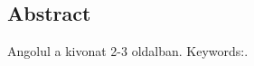 \begin{titlepage}

\section*{Abstract}

Angolul a kivonat 2-3 oldalban.
Keywords:.


\end{titlepage}